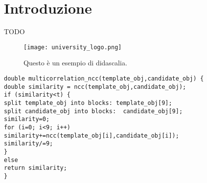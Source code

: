 \chapter{Introduzione}
TODO

\begin{figure}[t] %
	\texttt{[image: university\_logo.png]} %
	\caption{Questo è un esempio di didascalia.}
	\label{fig:immagine} %
\end{figure}


\begin{lstlisting}[caption={Didascalia},label=lst:multicorrelation]
double multicorrelation_ncc(template_obj,candidate_obj) {
double similarity = ncc(template_obj,candidate_obj);
if (similarity<t) {
split template_obj into blocks: template_obj[9];
split candidate_obj into blocks:  candidate_obj[9];
similarity=0;
for (i=0; i<9; i++)
similarity+=ncc(template_obj[i],candidate_obj[i]);
similarity/=9;
}
else
return similarity;
}
\end{lstlisting}







